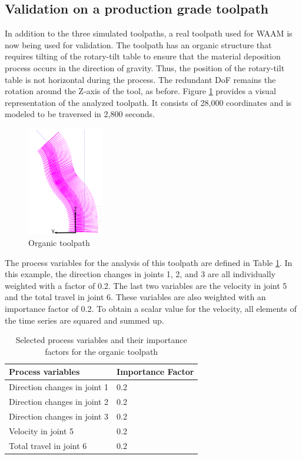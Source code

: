 \subsection{Validation on a production grade toolpath}\label{RG}
In addition to the three simulated toolpaths, a real toolpath used for \acrshort{WAAM} is now being used for validation. The toolpath has an organic structure that requires tilting of the rotary-tilt table to ensure that the material deposition process occurs in the direction of gravity. Thus, the position of the rotary-tilt table is not horizontal during the process. The redundant \acrshort{DoF} remains the rotation around the Z-axis of the tool, as before. Figure \ref{rav} provides a visual representation of the analyzed toolpath. It consists of 28,000 coordinates and is modeled to be traversed in 2,800 seconds.

\begin{figure}[H]
	\centerline{\includegraphics[width=0.3\textwidth]{figures/raven.png}}
	\caption{Organic toolpath  \cite{Reisch.2023}}
	\label{rav}
\end{figure}

The process variables for the analysis of this toolpath are defined in Table \ref{ravenparams}. In this example, the direction changes in joints 1, 2, and 3 are all individually weighted with a factor of 0.2. The last two variables are the velocity in joint 5 and the total travel in joint 6. These variables are also weighted with an importance factor of 0.2. To obtain a scalar value for the velocity, all elements of the time series are squared and summed up. 

\begin{table}[H]
	\centering
	\begin{tabular}{||l|l||}
		Process variables& Importance Factor \\
		\hline
		\hline
		\hline
		Direction changes in joint 1	&		0.2 \\
		Direction changes in joint 2	&		0.2 \\
		Direction changes in joint 3	&		0.2 \\
		Velocity in joint 5	&		0.2 \\
		Total travel in joint 6	&		0.2 \\
		\hline
		\hline
	\end{tabular}
	
	\caption{Selected process variables and their importance factors for the organic toolpath}
	\label{ravenparams}
\end{table}

